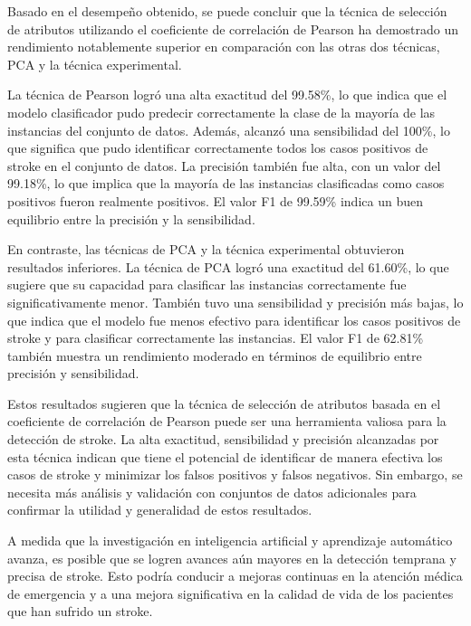 Basado en el desempeño obtenido, se puede concluir que la técnica de selección de atributos utilizando el coeficiente de correlación de Pearson ha demostrado un rendimiento notablemente superior en comparación con las otras dos técnicas, PCA y la técnica experimental.

La técnica de Pearson logró una alta exactitud del 99.58\%, lo que indica que el modelo clasificador pudo predecir correctamente la clase de la mayoría de las instancias del conjunto de datos. Además, alcanzó una sensibilidad del 100\%, lo que significa que pudo identificar correctamente todos los casos positivos de stroke en el conjunto de datos. La precisión también fue alta, con un valor del 99.18\%, lo que implica que la mayoría de las instancias clasificadas como casos positivos fueron realmente positivos. El valor F1 de 99.59\% indica un buen equilibrio entre la precisión y la sensibilidad.

En contraste, las técnicas de PCA y la técnica experimental obtuvieron resultados inferiores. La técnica de PCA logró una exactitud del 61.60\%, lo que sugiere que su capacidad para clasificar las instancias correctamente fue significativamente menor. También tuvo una sensibilidad y precisión más bajas, lo que indica que el modelo fue menos efectivo para identificar los casos positivos de stroke y para clasificar correctamente las instancias. El valor F1 de 62.81\% también muestra un rendimiento moderado en términos de equilibrio entre precisión y sensibilidad.

Estos resultados sugieren que la técnica de selección de atributos basada en el coeficiente de correlación de Pearson puede ser una herramienta valiosa para la detección de stroke. La alta exactitud, sensibilidad y precisión alcanzadas por esta técnica indican que tiene el potencial de identificar de manera efectiva los casos de stroke y minimizar los falsos positivos y falsos negativos. Sin embargo, se necesita más análisis y validación con conjuntos de datos adicionales para confirmar la utilidad y generalidad de estos resultados.

A medida que la investigación en inteligencia artificial y aprendizaje automático avanza, es posible que se logren avances aún mayores en la detección temprana y precisa de stroke. Esto podría conducir a mejoras continuas en la atención médica de emergencia y a una mejora significativa en la calidad de vida de los pacientes que han sufrido un stroke.
